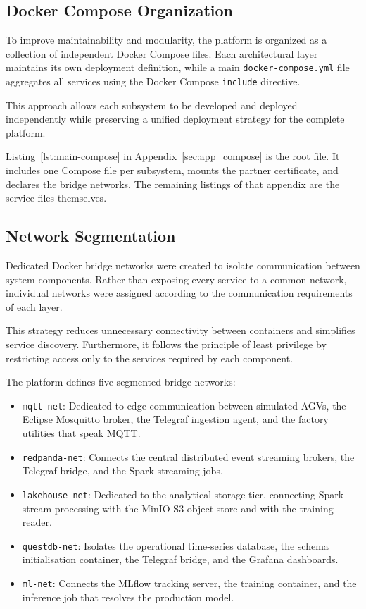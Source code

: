 \subsection{Docker Compose Organization} 
To improve maintainability and modularity, the platform is organized as a collection of independent Docker Compose files. Each architectural layer maintains its own deployment definition, while a main \texttt{docker-compose.yml} file aggregates all services using the Docker Compose \texttt{include} directive. 

This approach allows each subsystem to be developed and deployed independently while preserving a unified deployment strategy for the complete platform. 

Listing~\ref{lst:main-compose} in Appendix~\ref{sec:app_compose} is the root file. It includes one Compose file per subsystem, mounts the partner certificate, and declares the bridge networks. The remaining listings of that appendix are the service files themselves.


\subsection{Network Segmentation} 
Dedicated Docker bridge networks were created to isolate communication between system components. Rather than exposing every service to a common network, individual networks were assigned according to the communication requirements of each layer. 

This strategy reduces unnecessary connectivity between containers and simplifies service discovery. Furthermore, it follows the principle of least privilege by restricting access only to the services required by each component. 

The platform defines five segmented bridge networks:
\begin{itemize}
    \item \texttt{mqtt-net}: Dedicated to edge communication between simulated AGVs, the Eclipse Mosquitto broker, the Telegraf ingestion agent, and the factory utilities that speak MQTT.
    \item \texttt{redpanda-net}: Connects the central distributed event streaming brokers, the Telegraf bridge, and the Spark streaming jobs.
    \item \texttt{lakehouse-net}: Dedicated to the analytical storage tier, connecting Spark stream processing with the MinIO S3 object store and with the training reader.
    \item \texttt{questdb-net}: Isolates the operational time-series database, the schema initialisation container, the Telegraf bridge, and the Grafana dashboards.
    \item \texttt{ml-net}: Connects the MLflow tracking server, the training container, and the inference job that resolves the production model.
\end{itemize}

